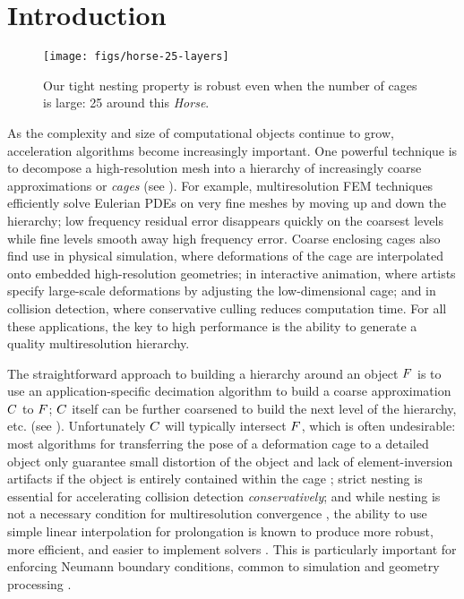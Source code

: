 \section{Introduction}
\label{sec:introduction}

\begin{figure}[b]
  \texttt{[image: figs/horse-25-layers]}
  \caption{Our tight nesting property is robust even when the number of cages
  is large: 25 around this \emph{Horse}.}
  \label{fig:horse-25-layers}
\end{figure}

As the complexity and size of computational objects continue to grow,
acceleration algorithms become increasingly important. One powerful technique
is to decompose a high-resolution mesh into a hierarchy of increasingly coarse
approximations or \emph{cages} (see ). For example,
multiresolution FEM techniques efficiently solve Eulerian PDEs on very fine
meshes by moving up and down the hierarchy; low frequency residual error
disappears quickly on the coarsest levels while fine levels smooth away high
frequency error. Coarse enclosing cages also find use in physical simulation,
where deformations of the cage are interpolated onto embedded high-resolution
geometries; in interactive animation, where artists specify large-scale
deformations by adjusting the low-dimensional cage; and in collision detection,
where conservative culling reduces computation time. For all these
applications, the key to high performance is the ability to generate a quality
multiresolution hierarchy.

The straightforward approach to building a hierarchy around an object $F$
is to use an application-specific decimation algorithm to build a coarse
approximation $C$ to $F$; $C$ itself can be further coarsened to
build the next level of the hierarchy, etc. (see ).
Unfortunately $C$ will typically intersect $F$, which is often
undesirable: most algorithms for transferring the pose of a deformation cage to
a detailed object only guarantee small distortion of the object and lack of
element-inversion artifacts if the object is entirely contained within the cage
\cite{HarmonicCoodinates07,Ben-Chen:2009:VHM}; strict nesting is essential for
accelerating collision detection \emph{conservatively}; and while nesting is
not a necessary condition for multiresolution convergence
\cite{Chan96overlappingschwarz}, the ability to use simple linear interpolation
for prolongation is known to produce more robust, more efficient, and easier to
implement solvers \cite{chan2000robust,dickopf2010multilevel}. This is
particularly important for enforcing Neumann boundary conditions, common to
simulation and geometry processing \cite{chan1999boundary}.

